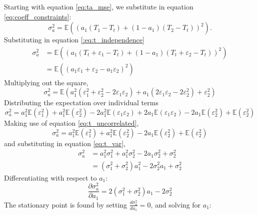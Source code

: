 Starting with equation \ref{eq:ta_mse}, we substitute in equation \ref{eq:coeff_constraints}:
\begin{equation*}
        \sigma_a^2 = \mathbb{E} \left( \left( a_1 \left( T_1 - T_t \right) + (1 - a_1) \left( T_2 - T_t \right) \right)^2 \right).
\end{equation*}
Substituting in equation \ref{:eq:t_independence}
\begin{align*}
        \sigma_a^2 &= \mathbb{E} \left( \left( a_1 \left( T_t + \varepsilon_1 - T_t \right) + (1 - a_1) \left( T_t +\varepsilon_2 - T_t \right) \right)^2 \right) \\
                    &= \mathbb{E} \left( \left( a_1 \varepsilon_1 +\varepsilon_2 - a_1 \varepsilon_2 \right)^2 \right)
\end{align*}
Multiplying out the square,
\begin{equation*}
    \sigma_a^2 = \mathbb{E} \left( a_1^2 \left( \varepsilon_1^2 + \varepsilon_2^2 - 2 \varepsilon_1 \varepsilon_2 \right) + a_1 \left( 2 \varepsilon_1 \varepsilon_2 - 2 \varepsilon_2^2 \right) + \varepsilon_2^2 \right)
\end{equation*}
Distributing the expectation over individual terms
\begin{equation*}
    \sigma_a^2 = a_1^2 \mathbb{E}(\varepsilon_1^2) + a_1^2 \mathbb{E}(\varepsilon_2^2) - 2 a_1^2 \mathbb{E}(\varepsilon_1 \varepsilon_2) + 2 a_1 \mathbb{E}(\varepsilon_1 \varepsilon_2) - 2 a_1 \mathbb{E}(\varepsilon_2^2) + \mathbb{E}(\varepsilon_2^2)
\end{equation*}
Making use of equation \ref{eq:t_uncorrelated},
\begin{equation*}
   \sigma_a^2 = a_1^2 \mathbb{E}(\varepsilon_1^2) + a_1^2 \mathbb{E}(\varepsilon_2^2) - 2 a_1 \mathbb{E}(\varepsilon_2^2) + \mathbb{E}(\varepsilon_2^2)
\end{equation*}
and substituting in equation \ref{eq:t_var},
\begin{align*}
   \sigma_a^2 &= a_1^2 \sigma_1^2 + a_1^2 \sigma_2^2 - 2 a_1 \sigma_2^2 + \sigma_2^2 \\
                &= \left( \sigma_1^2 + \sigma_2^2 \right) a_1^2 - 2 \sigma_2^2 a_1 + \sigma_2^2
\end{align*}
Differentiating with respect to $a_1$:
\begin{equation}
    \frac{\partial \sigma_a^2}{\partial a_1} = 2 \left( \sigma_1^2 + \sigma_2^2 \right) a_1 - 2 \sigma_2^2 \label{eq:derivative1}
\end{equation}
The stationary point is found by setting $\frac{d \sigma_a^2}{da_1} = 0$, and solving for $a_1$:
